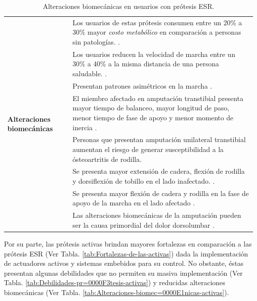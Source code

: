 \documentclass[12pt,english]{article}
\providecommand{\tabularnewline}{\\}
\begin{document}
\begin{center}
\begin{table}[H]
\caption{\label{tab:Alteraciones-biomec=0000E1nicas-ESR}Alteraciones biomecánicas
en usuarios con prótesis ESR.}


\centering{}%
\begin{tabular}{|l|>{\centering}p{15cm}|}
\hline 
\multirow{8}{*}[-17mm]{\begin{turn}{90}
\textbf{Alteraciones biomecánicas}
\end{turn}} & Los usuarios de estas prótesis consumen entre un 20\% a 30\% mayor
\emph{costo metabólico} en comparación a personas sin patologías.
\cite{Au2009,Schmalz2002}.\tabularnewline
\cline{2-2} 
 & Los usuarios reducen la velocidad de marcha entre un 30\% a 40\% a
la misma distancia de una persona saludable. \cite{Au2009,Buckley1997,Herr2010,Gates2013,Hill2013a,Schmalz2002}.\tabularnewline
\cline{2-2} 
 & Presentan patrones asimétricos en la marcha \cite{Au2009,Martinez-Villalpando2011,Hill2013a}.\tabularnewline
\cline{2-2} 
 & El miembro afectado en amputación transtibial presenta mayor tiempo
de balanceo, mayor longitud de paso, menor tiempo de fase de apoyo
y menor momento de inercia \cite{Mattes2000}.\tabularnewline
\cline{2-2} 
 & Personas que presentan amputación unilateral transtibial aumentan
el riesgo de generar susceptibilidad a la ósteoartritis de rodilla\cite{Grabowski2013}.\tabularnewline
\cline{2-2} 
 & Se presenta mayor extensión de cadera, flexión de rodilla y dorsiflexión
de tobillo en el lado inafectado. \cite{Bateni2002}.\tabularnewline
\cline{2-2} 
 & Se presenta mayor flexión de cadera y rodilla en la fase de apoyo
de la marcha en el lado afectado \cite{Bateni2002}.\tabularnewline
\cline{2-2} 
 & Las alteraciones biomecánicas de la amputación pueden ser la causa
primordial del dolor dorsolumbar \cite{Devan2014}. \tabularnewline
\hline 
\end{tabular}
\end{table}

\par\end{center}

Por su parte, las prótesis activas brindan mayores fortalezas en comparación
a las prótesis ESR (Ver Tabla. \ref{tab:Fortalezas-de-las-activas})
dada la implementación de actuadores activos y sistemas embebidos
para su control. No obstante, éstas presentan algunas debilidades
que no permiten su masiva implementación (Ver Tabla. \ref{tab:Debilidades-pr=0000F3tesis-activas}) y reducidas alteraciones biomecánicas (Ver Tabla. \ref{tab:Alteraciones-biomec=0000E1nicas-activas}).
\end{document}
